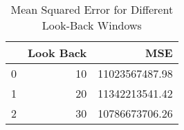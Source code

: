 \begin{table}
    \caption{Mean Squared Error for Different Look-Back Windows}
    \label{tab:mse_results}
    \begin{tabular}{lrr}
        \toprule
        & Look Back & MSE \\
        \midrule
        0 & 10 & 11023567487.98 \\
        1 & 20 & 11342213541.42 \\
        2 & 30 & 10786673706.26 \\
        \bottomrule
    \end{tabular}
\end{table}
